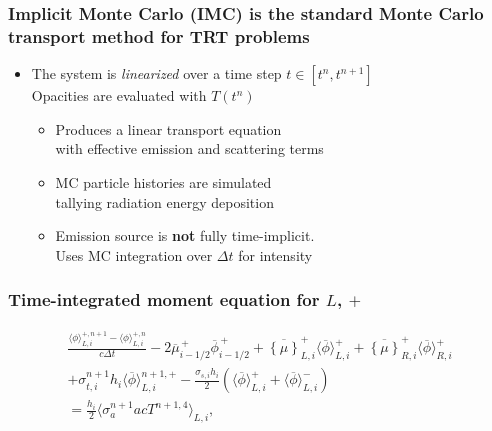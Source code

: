 \documentclass[xcolor=dvipsnames,hyperref={pdfpagelabels=false},unknownkeysallowed]{beamer}
\newcommand{\colG}[1]{{\color{Gray!110} #1}}
\newlength{\wideitemsep}
\let\olditem\item
\renewcommand{\item}{\setlength{\itemsep}{\wideitemsep}\olditem}
\newcommand{\mom}[1]{\langle #1 \rangle}
\newcommand{\cur}[1]{\left\{ #1 \right\}}
\newcommand{\phibar}{\ensuremath{\overline{\phi}}}
\begin{document}
\begin{frame}
    \frametitle{Implicit Monte Carlo (IMC) is the standard Monte Carlo transport method for TRT problems}
        \vspace{-0.2in}
\begin{itemize}
    \item[] The system is \emph{linearized} over a time step $t\in[t^n,t^{n+1}]$ \\ 
        \colG{Opacities are evaluated with $T(t^n)$}\vspace{0.21in}
\setlength\wideitemsep{0.2in}
    \begin{itemize}
        \item Produces a linear transport equation
               \\ \colG{with effective emission and scattering terms}
        \item MC particle histories are simulated 
            \\ \colG{tallying radiation energy deposition}
        \item Emission source is \textbf{not} fully time-implicit.\\
            \colG{Uses MC integration over $\Delta t$ for intensity}
    \end{itemize}
\end{itemize}
\end{frame}


\begin{frame}
    \frametitle{Time-integrated moment equation for $L$, $+$}
\begin{multline}\label{eq:t_moml_ex}
    \frac{\mom{\phi}_{L,i}^{+,n+1} - \mom{\phi}_{L,i}^{+,n}}{c \Delta t}
    -2\overline {\mu}_{i-1/2}^{\,+} \overline \phi_{i-1/2}^{\,+} + \overline{\cur {\mu}}_{L,i}^{+}
  \mom{\phibar}_{L,i}^{+}
  +  \overline{\cur\mu}_{R,i}^{+}
  \mom{\phibar}_{R,i}^{+}  \\ +   \sigma_{t,i}^{n+1} h_i 
  \mom{\overline\phi}_{L,i}^{n+1,+} -  \frac{\sigma_{s,i} h_i}{2} \left( \mom{\phibar}_{L,i}^{+} +
  \mom{\phibar}_{L,i}^{-}\right)  \\ = \frac{h_i}{2} \mom{\sigma_a^{n+1} a c T^{n+1,4}}_{L,i},
\end{multline}
\end{frame}
\end{document}
